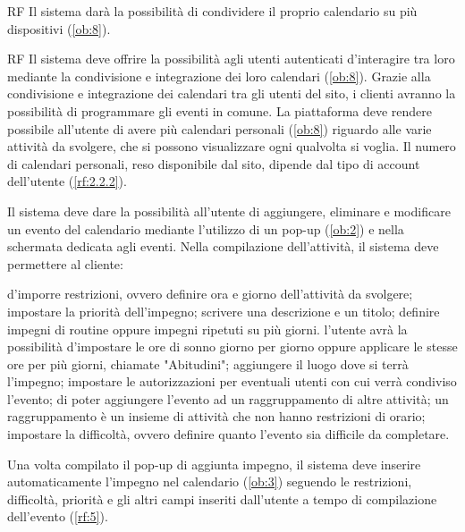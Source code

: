 \begin{listaPersonale}{RF}
	 Il sistema darà la possibilità di condividere il proprio calendario su più dispositivi (\ref{ob:8}).

	\begin{listaPersonale2}{RF}
		 Il sistema deve offrire la possibilità agli utenti autenticati d'interagire tra loro mediante la condivisione e integrazione dei loro calendari (\ref{ob:8}). Grazie alla condivisione e integrazione dei calendari tra gli utenti del sito, i clienti avranno la possibilità di programmare gli eventi in comune.
		 La piattaforma deve rendere possibile all’utente di avere più calendari personali (\ref{ob:8}) riguardo alle varie attività da svolgere, che si possono visualizzare ogni qualvolta si voglia. Il numero di calendari personali, reso disponibile dal sito, dipende dal tipo di account dell’utente (\ref{rf:2.2.2}).
	\end{listaPersonale2}

	 Il sistema deve dare la possibilità all'utente di aggiungere, eliminare e modificare un evento del calendario mediante l'utilizzo di un pop-up (\ref{ob:2}) e nella schermata dedicata agli eventi. Nella compilazione dell'attività, il sistema deve permettere al cliente:
	\begin{listaPersonale2}{}
		 d'imporre restrizioni, ovvero definire ora e giorno dell'attività da svolgere;
		 impostare la priorità dell'impegno;
		 scrivere una descrizione e un titolo;
		 definire impegni di routine oppure impegni ripetuti su più giorni.
		 l'utente avrà la possibilità d'impostare le ore di sonno giorno per giorno oppure applicare le stesse ore per più giorni, chiamate "Abitudini";
		 aggiungere il luogo dove si terrà l'impegno;
		 impostare le autorizzazioni per eventuali utenti con cui verrà condiviso l'evento;
		 di poter aggiungere l'evento ad un raggruppamento di altre attività; un raggruppamento è un insieme di attività che non hanno restrizioni di orario;
		 impostare la difficoltà, ovvero definire quanto l'evento sia difficile da completare.
	\end{listaPersonale2}


	 Una volta compilato il pop-up di aggiunta impegno, il sistema deve inserire automaticamente l'impegno nel calendario (\ref{ob:3}) seguendo le restrizioni, difficoltà, priorità e gli altri campi inseriti dall'utente a tempo di compilazione dell'evento (\ref{rf:5}).


\end{listaPersonale}
